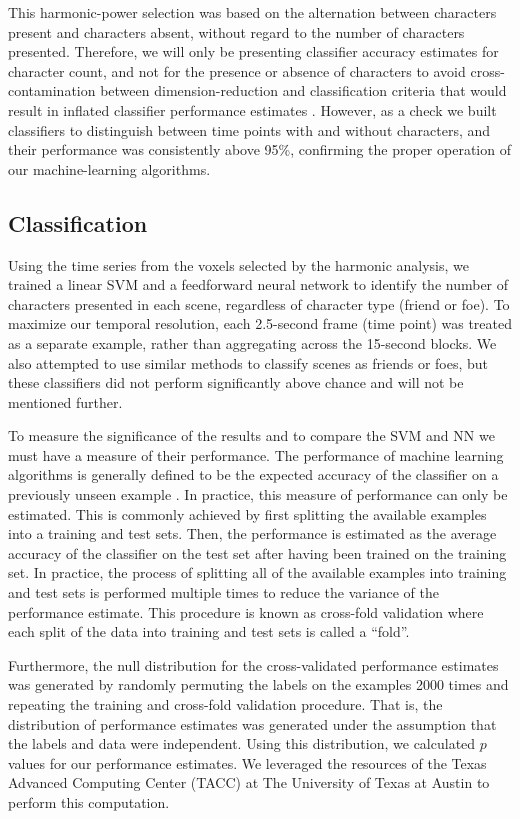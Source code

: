 \documentclass[review,1p,authoryear]{elsarticle}
\begin{document}
This harmonic-power selection was based on the alternation between characters present and characters absent, without regard to the number of characters presented. 
Therefore, we will only be presenting classifier accuracy estimates for character count, and not for the presence or absence of characters to avoid cross-contamination between dimension-reduction and  classification criteria that would result in inflated classifier performance estimates \citep{Pereira2009}.
However, as a check we built classifiers to distinguish between time points with and without characters, and their performance was consistently above 95\%, confirming the proper operation of our machine-learning algorithms.

\subsection{Classification}
Using the time series from the voxels selected by the harmonic analysis, we trained a linear SVM \citep{Cortes1995} and a feedforward neural network \citep{Hornik1989,Hagan1994} to identify the number of characters presented in each scene, regardless of character type (friend or foe).
To maximize our temporal resolution, each 2.5-second frame (time point) was treated as a separate example, rather than aggregating across the 15-second blocks.
We also attempted to use similar methods to classify scenes as friends or foes, but these classifiers did not perform significantly above chance and will not be mentioned further.

To measure the significance of the results and to compare the SVM and NN we must have a measure of their performance.
The performance of machine learning algorithms is generally defined to be the expected accuracy of the classifier on a previously unseen example \citep{Bishop2006}.
In practice, this measure of performance can only be estimated.
This is commonly achieved by first splitting the available examples into a training and test sets.
Then, the performance is estimated as the average accuracy of the classifier on the test set after having been trained on the training set.
In practice, the process of splitting all of the available examples into training and test sets is performed multiple times to reduce the variance of the performance estimate.
This procedure is known as cross-fold validation \citep{Kohavi1995} where each split of the data into training and test sets is called a ``fold''.

Furthermore, the null distribution for the cross-validated performance estimates was generated by randomly permuting the labels on the examples 2000 times and repeating the training and cross-fold validation procedure.
That is, the distribution of performance estimates was generated under the assumption that the labels and data were independent.
Using this distribution, we calculated $p$ values for our performance estimates.
We leveraged the resources of the Texas Advanced Computing Center (TACC) at The University of Texas at Austin to perform this computation.
\end{document}
